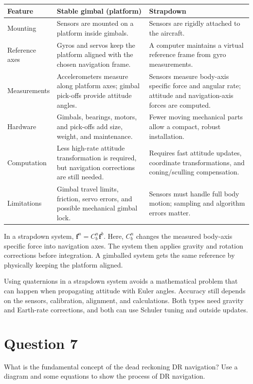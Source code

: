\documentclass[12pt,a4paper]{article}
\begin{document}
\small
\begin{tabular}{@{}P{2.5cm}P{6.0cm}P{6.6cm}@{}}
\toprule
Feature & Stable gimbal (platform) & Strapdown \\
\midrule
Mounting & Sensors are mounted on a platform inside gimbals. & Sensors are rigidly attached to the aircraft. \\
\addlinespace
Reference axes & Gyros and servos keep the platform aligned with the chosen navigation frame. & A computer maintains a virtual reference frame from gyro measurements. \\
\addlinespace
Measurements & Accelerometers measure along platform axes; gimbal pick-offs provide attitude angles. & Sensors measure body-axis specific force and angular rate; attitude and navigation-axis forces are computed. \\
\addlinespace
Hardware & Gimbals, bearings, motors, and pick-offs add size, weight, and maintenance. & Fewer moving mechanical parts allow a compact, robust installation. \\
\addlinespace
Computation & Less high-rate attitude transformation is required, but navigation corrections are still needed. & Requires fast attitude updates, coordinate transformations, and coning/sculling compensation. \\
\addlinespace
Limitations & Gimbal travel limits, friction, servo errors, and possible mechanical gimbal lock. & Sensors must handle full body motion; sampling and algorithm errors matter. \\
\bottomrule
\end{tabular}
\normalsize

In a strapdown system, $\mathbf f^n=C_b^n\mathbf f^b$. Here, $C_b^n$ changes the measured body-axis specific force into navigation axes. The system then applies gravity and rotation corrections before integration. A gimballed system gets the same reference by physically keeping the platform aligned.

Using quaternions in a strapdown system avoids a mathematical problem that can happen when propagating attitude with Euler angles. Accuracy still depends on the sensors, calibration, alignment, and calculations. Both types need gravity and Earth-rate corrections, and both can use Schuler tuning and outside updates.

\newpage
\section*{Question 7}
What is the fundamental concept of the dead reckoning DR navigation? Use a diagram and some equations to show the process of DR navigation.
\end{document}
